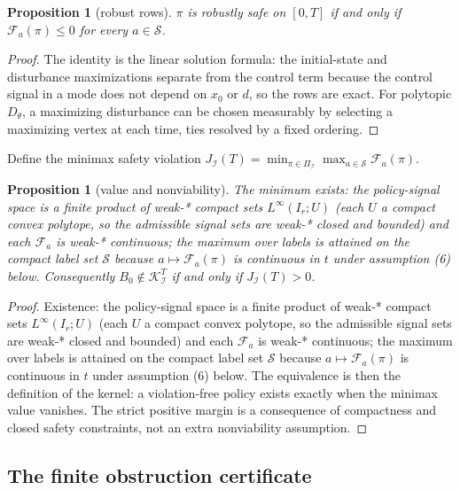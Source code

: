 \documentclass[10pt,twocolumn]{article}
\theoremstyle{plain}
\newtheorem{proposition}[theorem]{Proposition}
\theoremstyle{definition}
\theoremstyle{remark}
\begin{document}
\begin{proposition}[robust rows]\label{prop:rows}
\(\pi\) is robustly safe on \([0,T]\) if and only if
\(\mathcal{F}_a(\pi) \le 0\) for every \(a \in \mathscr{S}\).
\end{proposition}

\begin{proof}
The identity is the linear solution formula: the initial-state and
disturbance maximizations separate from the control term because the
control signal in a mode does not depend on \(x_0\) or \(d\), so the
rows are exact. For polytopic \(D_\theta\), a maximizing disturbance
can be chosen measurably by selecting a maximizing vertex at each time,
ties resolved by a fixed ordering.
\end{proof}

Define the minimax safety violation
\(J_{\mathcal{I}}(T) = \min_{\pi \in \Pi_{\mathcal{I}}} \max_{a \in
\mathscr{S}} \mathcal{F}_a(\pi)\).

\begin{proposition}[value and nonviability]\label{prop:value}
The minimum exists: the policy-signal space is a finite product of
weak-* compact sets \(L^\infty(I_r; U)\) (each \(U\) a compact convex
polytope, so the admissible signal sets are weak-* closed and bounded) and
each \(\mathcal{F}_a\) is weak-* continuous; the maximum over labels is
attained on the compact label set \(\mathscr{S}\) because
\(a \mapsto \mathcal{F}_a(\pi)\) is continuous in \(t\) under
assumption (6) below. Consequently
\(B_0 \notin \mathcal{K}_{\mathcal{I}}^T\) if and only if
\(J_{\mathcal{I}}(T) > 0\).
\end{proposition}

\begin{proof}
Existence: the policy-signal space is a finite product of weak-*
compact sets \(L^\infty(I_r; U)\) (each \(U\) a compact convex
polytope, so the admissible signal sets are weak-* closed and bounded)
and each \(\mathcal{F}_a\) is weak-* continuous; the maximum over
labels is attained on the compact label set \(\mathscr{S}\) because
\(a \mapsto \mathcal{F}_a(\pi)\) is continuous in \(t\) under
assumption (6) below. The equivalence is then the definition of the
kernel: a violation-free policy exists exactly when the minimax value
vanishes. The strict positive margin is a consequence of compactness
and closed safety constraints, not an extra nonviability assumption.
\end{proof}

\subsection{The finite obstruction certificate}\label{certificate}
\end{document}
